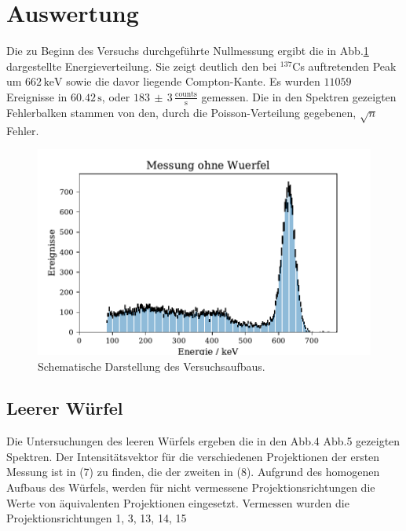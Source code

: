 \section{Auswertung}
Die zu Beginn des Versuchs durchgeführte Nullmessung ergibt die in Abb.\ref{Leermessung1} dargestellte Energieverteilung. Sie zeigt deutlich den bei $^{137}$Cs auftretenden Peak um $662 \, \si{\kilo\electronvolt}$ sowie die davor liegende
Compton-Kante. Es wurden $11059$ Ereignisse in $60.42 \, \si{\second}$, oder $183 \,  \pm \, 3\, \frac{\text{counts}}{\si{\second}}$ gemessen.
Die in den Spektren gezeigten Fehlerbalken stammen von den, durch die Poisson-Verteilung gegebenen, $\sqrt{n}$ Fehler.
\begin{figure}[H]
  \centering
  \includegraphics{plots/leer.pdf}
  \caption{Schematische Darstellung des Versuchsaufbaus.\cite{anleitung}}
  \label{Leermessung1}
\end{figure}
\subsection{Leerer Würfel}
Die Untersuchungen des leeren Würfels ergeben die in den Abb.4 Abb.5 gezeigten Spektren. Der Intensitätsvektor
für die verschiedenen Projektionen der ersten Messung ist in (7) zu finden, die der zweiten in (8).
Aufgrund des homogenen Aufbaus des Würfels,
werden für nicht vermessene Projektionsrichtungen die Werte von äquivalenten Projektionen eingesetzt.
Vermessen wurden die Projektionsrichtungen 1, 3, 13, 14, 15

